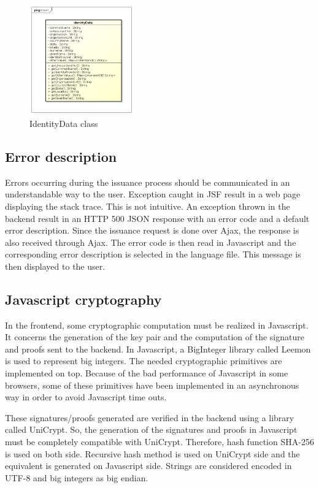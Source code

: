 \documentclass[oneside]{scrreprt}
\begin{document}
\begin{figure}[ht]
\centerline{
\includegraphics[width=0.4\textwidth]{figs/IdentityData_class.png}}
\caption{IdentityData class}
\label{fig:identity_data}
\end{figure}

\subsection{Error description}

Errors occurring during the issuance process should be communicated in an understandable way to the user. Exception caught in JSF result in a web page displaying the stack trace. This is not intuitive. An exception thrown in the backend result in an HTTP 500 JSON response with an error code and a default error description. Since the issuance request is done over Ajax, the response is also received through Ajax. The error code is then read in Javascript and the corresponding error description is selected in the language file. This message is then displayed to the user.

\subsection{Javascript cryptography}

In the frontend, some cryptographic computation must be realized in Javascript. It concerns the generation of the key pair and the computation of the signature and proofs sent to the backend. In Javascript, a BigInteger library called Leemon \cite{leemon} is used to represent big integers. The needed cryptographic primitives are implemented on top. Because of the bad performance of Javascript in some browsers, some of these primitives have been implemented in an asynchronous way in order to avoid Javascript time outs.

These signatures/proofs generated are verified in the backend using a library called UniCrypt. So, the generation of the signatures and proofs in Javascript must be completely compatible with UniCrypt. Therefore, hash function SHA-256 is used on both side. Recursive hash method is used on UniCrypt side and the equivalent is generated on Javascript side. Strings are considered encoded in UTF-8 and big integers as big endian. 
\end{document}
